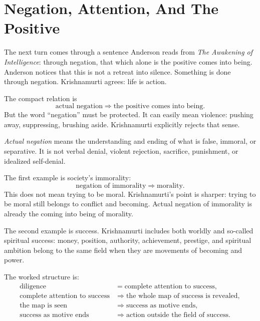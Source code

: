 \section{Negation, Attention, And The Positive}

The next turn comes through a sentence Anderson reads from \emph{The Awakening of Intelligence}: through negation, that which alone is the positive comes into being. Anderson notices that this is not a retreat into silence. Something is done through negation. Krishnamurti agrees: life is action.

The compact relation is
\begin{equation}
\text{actual negation}
\Longrightarrow
\text{the positive comes into being}.
\end{equation}
But the word ``negation'' must be protected. It can easily mean violence: pushing away, suppressing, brushing aside. Krishnamurti explicitly rejects that sense.

\begin{definition}
\emph{Actual negation} means the understanding and ending of what is false, immoral, or separative. It is not verbal denial, violent rejection, sacrifice, punishment, or idealized self-denial.
\end{definition}

The first example is society's immorality:
\begin{equation}
\text{negation of immorality}
\Longrightarrow
\text{morality}.
\end{equation}
This does not mean trying to be moral. Krishnamurti's point is sharper: trying to be moral still belongs to conflict and becoming. Actual negation of immorality is already the coming into being of morality.

The second example is success. Krishnamurti includes both worldly and so-called spiritual success: money, position, authority, achievement, prestige, and spiritual ambition belong to the same field when they are movements of becoming and power.

The worked structure is:
\begin{align}
\text{diligence}
&=
\text{complete attention to success},\\
\text{complete attention to success}
&\Longrightarrow
\text{the whole map of success is revealed},\\
\text{the map is seen}
&\Longrightarrow
\text{success as motive ends},\\
\text{success as motive ends}
&\Longrightarrow
\text{action outside the field of success}.
\end{align}

